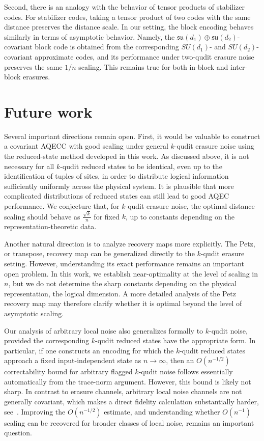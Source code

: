 \documentclass[10pt,twocolumn,superscriptaddress,aps,amsmath,amssymb,citeautoscript,floatfix,prx]{revtex4-2}
\theoremstyle{plain}
\theoremstyle{plain}
\theoremstyle{plain}
\theoremstyle{plain}
\theoremstyle{plain}
\theoremstyle{plain}
\begin{document}
Second, there is an analogy with the behavior of tensor products of stabilizer codes. For stabilizer codes, taking a tensor product of two codes with the same distance preserves the distance scale. In our setting, the block encoding behaves similarly in terms of asymptotic behavior. Namely, the
\(\mathfrak{su}(d_1)\oplus\mathfrak{su}(d_2)\)-covariant block code is obtained from the corresponding \(SU(d_1)\)- and \(SU(d_2)\)-covariant approximate codes, and its performance under two-qudit erasure noise preserves the same \(1/n\)
scaling. This remains true for both in-block and inter-block erasures.

\section{Future work}\label{sec:main_future_work}

Several important directions remain open.
First, it would be valuable to construct a covariant AQECC with good scaling under general \(k\)-qudit erasure noise using the reduced-state method developed in this work. As discussed above, it is not necessary for all \(k\)-qudit reduced states to be identical, even up to the identification of tuples of sites, in order to distribute logical information sufficiently uniformly across the physical system. It is plausible that more complicated distributions of reduced states can still lead to good AQEC performance. We conjecture that, for \(k\)-qudit erasure noise, the optimal distance scaling should behave as
$
    \frac{\sqrt{k}}{n}
$
for fixed \(k\), up to constants depending on the representation-theoretic data.

Another natural direction is to analyze recovery maps more explicitly. The Petz, or transpose, recovery map can be generalized directly to the \(k\)-qudit erasure setting. However, understanding its exact performance remains an important open problem. In this work, we establish near-optimality at the level of scaling in \(n\), but we do not determine the sharp constants depending on the physical representation, the logical dimension. A more detailed analysis of the Petz recovery map may therefore clarify whether it is optimal beyond the level of asymptotic scaling.

Our analysis of arbitrary local noise also generalizes formally to \(k\)-qudit noise, provided the corresponding \(k\)-qudit reduced states have the appropriate form. In particular, if one constructs an encoding for which the \(k\)-qudit reduced states approach a fixed input-independent state as \(n\to\infty\), then an \(O(n^{-1/2})\) correctability bound for arbitrary flagged \(k\)-qudit noise follows essentially automatically from the trace-norm argument. However, this bound is likely not sharp. In contrast to erasure channels, arbitrary local noise channels are not generally covariant, which makes a direct fidelity calculation substantially harder, see~\cite{Alexander2025, Zhou2021}. Improving the \(O(n^{-1/2})\) estimate, and understanding whether \(O(n^{-1})\) scaling can be recovered for broader classes of local noise, remains an important question.
\end{document}
